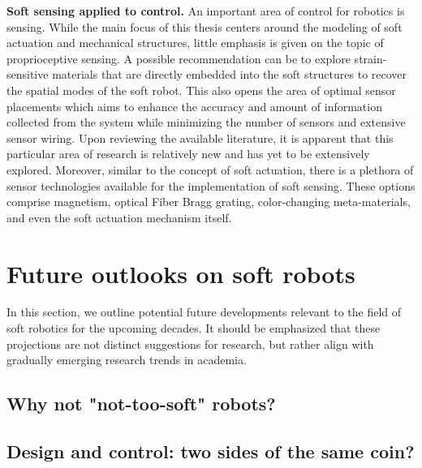 \textbf{Soft sensing applied to control.} An important area of control for robotics is sensing. While the main focus of this thesis centers around the modeling of soft actuation and mechanical structures, little emphasis is given on the topic of proprioceptive sensing. A possible recommendation can be to explore strain-sensitive materials that are directly embedded into the soft structures to recover the spatial modes of the soft robot. This also opens the area of optimal sensor placements which aims to enhance the accuracy and amount of information collected from the system while minimizing the number of sensors and extensive sensor wiring. Upon reviewing the available literature, it is apparent that this particular area of research is relatively new and has yet to be extensively explored. Moreover, similar to the concept of soft actuation, there is a plethora of sensor technologies available for the implementation of soft sensing. These options comprise magnetism, optical Fiber Bragg grating, color-changing meta-materials, and even the soft actuation mechanism itself.

\section{Future outlooks on soft robots}
In this section, we outline potential future developments relevant to the field of soft robotics for the upcoming decades. It should be emphasized that these projections are not distinct suggestions for research, but rather align with gradually emerging research trends in academia.

\subsection*{Why not "not-too-soft" robots?}

\subsection*{Design and control: two sides of the same coin?}




